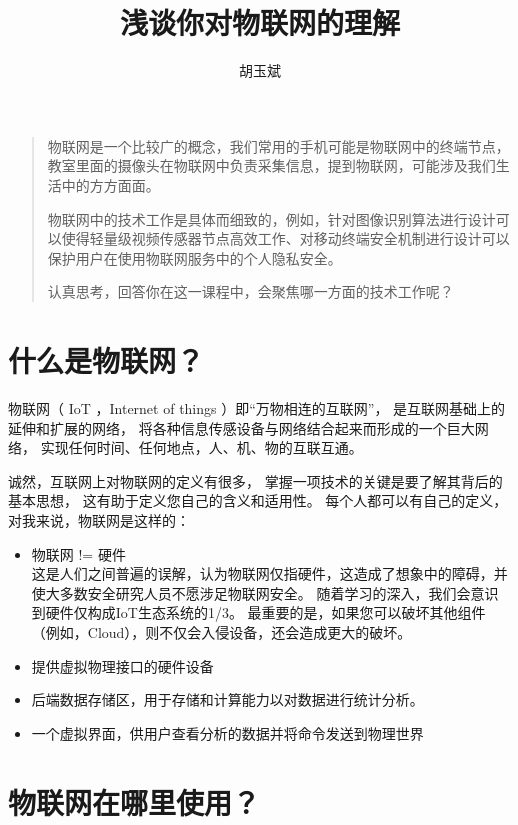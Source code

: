 \documentclass[onecolumn,oneside]{BUPTHomework}
\author{胡玉斌}
\title{浅谈你对物联网的理解}
\begin{document}
  \maketitle
  
  \begin{quotation}
    物联网是一个比较广的概念，我们常用的手机可能是物联网中的终端节点，教室里面的摄像头在物联网中负责采集信息，提到物联网，可能涉及我们生活中的方方面面。
    
    物联网中的技术工作是具体而细致的，例如，针对图像识别算法进行设计可以使得轻量级视频传感器节点高效工作、对移动终端安全机制进行设计可以保护用户在使用物联网服务中的个人隐私安全。
    
    认真思考，回答你在这一课程中，会聚焦哪一方面的技术工作呢？
  \end{quotation}
  
  \section{什么是物联网？}

  物联网（ IoT ，Internet of things ）即“万物相连的互联网”，
  是互联网基础上的延伸和扩展的网络，
  将各种信息传感设备与网络结合起来而形成的一个巨大网络，
  实现任何时间、任何地点，人、机、物的互联互通。

  诚然，互联网上对物联网的定义有很多，
  掌握一项技术的关键是要了解其背后的基本思想，
  这有助于定义您自己的含义和适用性。
  每个人都可以有自己的定义，对我来说，物联网是这样的：

  \begin{itemize}
    \item 物联网 != 硬件 \\
    这是人们之间普遍的误解，认为物联网仅指硬件，这造成了想象中的障碍，并使大多数安全研究人员不愿涉足物联网安全。
    随着学习的深入，我们会意识到硬件仅构成IoT生态系统的1/3。
    最重要的是，如果您可以破坏其他组件（例如，Cloud），则不仅会入侵设备，还会造成更大的破坏。
    \item 提供虚拟物理接口的硬件设备
    \item 后端数据存储区，用于存储和计算能力以对数据进行统计分析。
    \item 一个虚拟界面，供用户查看分析的数据并将命令发送到物理世界
  \end{itemize}


  \section{物联网在哪里使用？}
\end{document}
